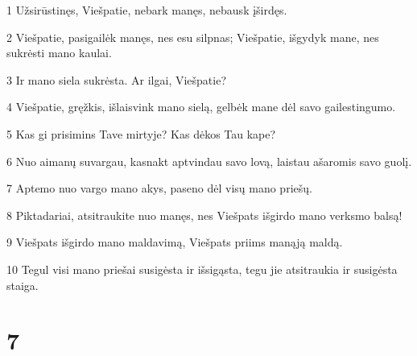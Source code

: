 \par 1 Užsirūstinęs, Viešpatie, nebark manęs, nebausk įširdęs. 
\par 2 Viešpatie, pasigailėk manęs, nes esu silpnas; Viešpatie, išgydyk mane, nes sukrėsti mano kaulai. 
\par 3 Ir mano siela sukrėsta. Ar ilgai, Viešpatie? 
\par 4 Viešpatie, gręžkis, išlaisvink mano sielą, gelbėk mane dėl savo gailestingumo. 
\par 5 Kas gi prisimins Tave mirtyje? Kas dėkos Tau kape? 
\par 6 Nuo aimanų suvargau, kasnakt aptvindau savo lovą, laistau ašaromis savo guolį. 
\par 7 Aptemo nuo vargo mano akys, paseno dėl visų mano priešų. 
\par 8 Piktadariai, atsitraukite nuo manęs, nes Viešpats išgirdo mano verksmo balsą! 
\par 9 Viešpats išgirdo mano maldavimą, Viešpats priims manąją maldą. 
\par 10 Tegul visi mano priešai susigėsta ir išsigąsta, tegu jie atsitraukia ir susigėsta staiga.



\chapter{7}


